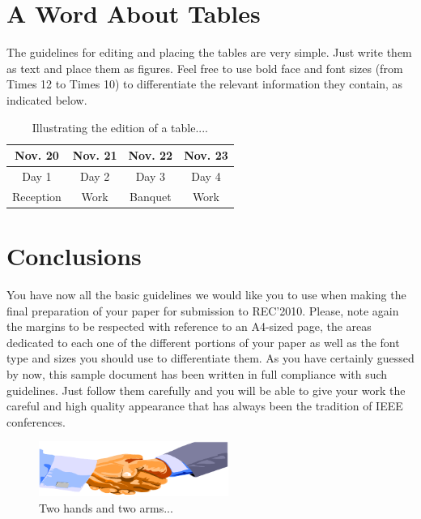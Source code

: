 \documentclass{IEEEconfA4}
\begin{document}
\section{A Word About Tables}

The guidelines for editing and placing the tables are very simple. Just write them as text and place them as figures. Feel free to use bold face and font sizes (from Times 12 to Times 10) to differentiate the relevant information they contain, as indicated below.

\begin{table}[htbp]
  \centering
    \begin{tabular}{|c|c|c|c|}
    \hline
    {\bf Nov.  20} & {\bf Nov.  21} & {\bf Nov.  22} & {\bf Nov.  23} \\
    \hline
    Day 1 & Day 2 & Day 3 & Day 4 \\
    \hline
    Reception & Work  & Banquet & Work \\
    \hline
    \end{tabular}
  \caption{Illustrating the edition of a table....}
  \label{tab:addlabel}
\end{table}

\section{Conclusions}

You have now all the basic guidelines we would like you to use when making the final preparation of your paper for submission to REC'2010. Please, note again the margins to be respected with reference to an A4-sized page, the areas dedicated to each one of the different portions of your paper as well as the font type and sizes you should use to differentiate them. As you have certainly guessed by now, this sample document has been written in full compliance with such guidelines. Just follow them carefully and you will be able to give your work the careful and high quality appearance that has always been the tradition of IEEE conferences.

\begin{figure}[!htbp]
    \centerline{\includegraphics[width=6.2cm]{twoarms.pdf}}
    \vspace{-3mm}\caption{Two hands and two arms...}
    \label{fig:twohands}
\end{figure}



\nocite{*}
\end{document}
